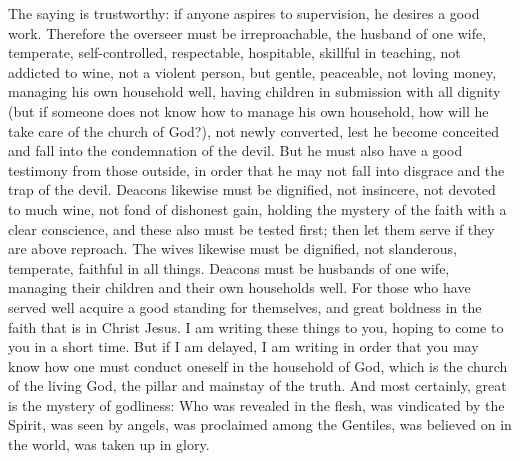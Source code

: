 \begin{biblechapter} %
 The saying is trustworthy: if anyone aspires to supervision, he desires a good work.
\verse Therefore the overseer must be irreproachable, the husband of one wife, temperate, self-controlled, respectable, hospitable, skillful in teaching,
\verse not addicted to wine, not a violent person, but gentle, peaceable, not loving money,
\verse managing his own household well, having children in submission with all dignity
\verse (but if someone does not know how to manage his own household, how will he take care of the church of God?),
\verse not newly converted, lest he become conceited and fall into the condemnation of the devil.
\verse But he must also have a good testimony from those outside, in order that he may not fall into disgrace and the trap of the devil.
 Deacons likewise must be dignified, not insincere, not devoted to much wine, not fond of dishonest gain,
\verse holding the mystery of the faith with a clear conscience,
\verse and these also must be tested first; then let them serve if they are above reproach.
\verse The wives likewise must be dignified, not slanderous, temperate, faithful in all things.
\verse Deacons must be husbands of one wife, managing their children and their own households well.
\verse For those who have served well acquire a good standing for themselves, and great boldness in the faith that is in Christ Jesus.
 I am writing these things to you, hoping to come to you in a short time.
\verse But if I am delayed, I am writing in order that you may know how one must conduct oneself in the household of God, which is the church of the living God, the pillar and mainstay of the truth.
\verse And most certainly, great is the mystery of godliness: Who was revealed in the flesh, 
was vindicated by the Spirit, 
was seen by angels, 
was proclaimed among the Gentiles, 
was believed on in the world, 
was taken up in glory.
\end{biblechapter}

